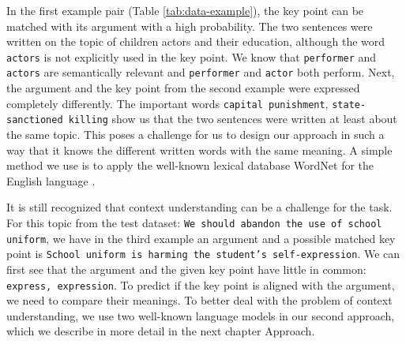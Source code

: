 In the first example pair (Table \ref{tab:data-example}), the key point can be matched with its argument with a high probability. 
The two sentences were written on the topic of children actors and their education, although the word \texttt{actors} is not explicitly used in the key point. 
We know that \texttt{performer} and \texttt{actors} are semantically relevant and \texttt{performer} and \texttt{actor} both perform. Next, the argument and the key point from the second example were expressed completely differently. 
The important words \texttt{capital punishment}, \texttt{state-sanctioned killing} show us that the two sentences were written at least about the same topic. 
This poses a challenge for us to design our approach in such a way that it knows the different written words with the same meaning. 
A simple method we use is to apply the well-known lexical database WordNet for the English language \cite{Miller1995}.

It is still recognized that context understanding can be a challenge for the task. For this topic from the test dataset:
\texttt{We should abandon the use of school uniform}, we have in the third example an argument and a possible matched key point is \texttt{School uniform is harming the student's self-expression}. 
We can first see that the argument and the given key point have little in common: \texttt{express, expression}. 
To predict if the key point is aligned with the argument, we need to compare their meanings. 
To better deal with the problem of context understanding, we use two well-known language models in our second approach, which we describe in more detail in the next chapter Approach.
